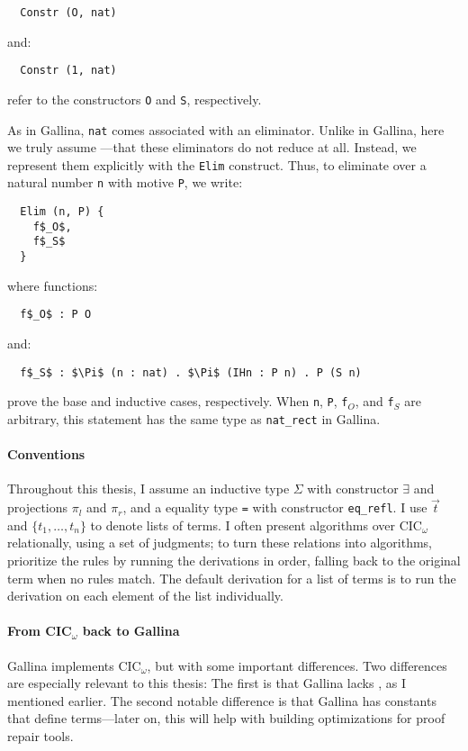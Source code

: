 \begin{lstlisting}
  Constr (O, nat)
\end{lstlisting}
and:

\begin{lstlisting}
  Constr (1, nat)
\end{lstlisting}
refer to the constructors \lstinline{O} and \lstinline{S}, respectively.

As in Gallina, \lstinline{nat} comes associated with an eliminator.
Unlike in Gallina, here we truly assume ---that these eliminators
do not reduce at all.
Instead, we represent them explicitly with the \lstinline{Elim} construct.
Thus, to eliminate over a natural number \lstinline{n} with motive \lstinline{P},
we write: %

\begin{lstlisting}
  Elim (n, P) {
    f$_O$,
    f$_S$
  }
\end{lstlisting}
where functions:

\begin{lstlisting}
  f$_O$ : P O
\end{lstlisting}
and:

\begin{lstlisting}
  f$_S$ : $\Pi$ (n : nat) . $\Pi$ (IHn : P n) . P (S n)
\end{lstlisting}
prove the base and inductive cases, respectively.
When \lstinline{n}, \lstinline{P}, \lstinline{f}$_O$, and \lstinline{f}$_S$ are arbitrary,
this statement has the same type as \lstinline{nat_rect} in Gallina.

\paragraph{Conventions}
Throughout this thesis, I assume an inductive type $\Sigma$ with constructor $\exists$ and projections $\pi_l$ and $\pi_r$,
and a  equality type \lstinline{=} with constructor \lstinline{eq_refl}.
I use $\vec{t}$ and $\{t_1, \ldots, t_n\}$ to denote lists of terms.
I often present algorithms over CIC$_{\omega}$ relationally, using a set of judgments; %
to turn these relations into algorithms, prioritize the rules by running the derivations in
order, falling back to the original term when no rules match.
The default derivation for a list of terms is to run the derivation on each element of the list individually. 

\paragraph{From CIC$_{\omega}$ back to Gallina}
Gallina implements CIC$_{\omega}$, but with some important differences.
Two differences are especially relevant to this thesis:
The first is that Gallina lacks , as I mentioned earlier.
The second notable difference is that Gallina has constants that define terms---later on, this will help with building optimizations for proof repair tools.

